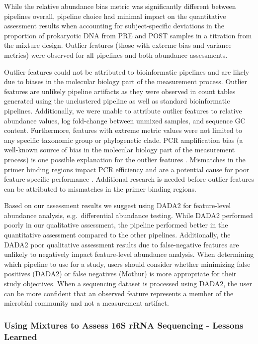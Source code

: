 \documentclass{bmcart}
\begin{document}
While the relative abundance bias metric was significantly different
between pipelines overall, pipeline choice had minimal impact on the
quantitative assessment results when accounting for subject-specific deviations
in the proportion of prokaryotic DNA from PRE and POST samples in a
titration from the mixture design. Outlier features (those with extreme bias
and variance metrics) were observed for all pipelines and both abundance assessments.

Outlier features could not be attributed to bioinformatic pipelines
and are likely due to biases in the molecular biology part of the measurement process.
Outlier features are unlikely pipeline artifacts as they were observed in count tables generated
using the unclustered pipeline as well as standard bioinformatic
pipelines. Additionally, we were unable to attribute outlier features to relative
abundance values, log fold-change between unmixed samples, and sequence
GC content. Furthermore, features with extreme metric values were not limited to any
specific taxonomic group or phylogenetic clade. PCR amplification
bias (a well-known source of bias in the molecular biology part of the
measurement process) is one possible explanation for the outlier features \cite{Sze565598}.
Mismatches in the primer binding regions impact PCR efficiency
and are a potential cause for poor feature-specific
performance \cite{wright2014exploiting}. Additional research is
needed before outlier features can be attributed to mismatches in the primer binding regions.

Based on our assessment results we suggest using DADA2 for
feature-level abundance analysis, e.g.~differential abundance testing.
While DADA2 performed poorly in our qualitative assessment,
the pipeline performed better in the quantitative assessment compared to the other pipelines.
Additionally, the DADA2 poor qualitative assessment results due to
false-negative features are unlikely to negatively impact feature-level abundance analysis.
When determining which pipeline to use for a study, users should consider
whether minimizing false positives (DADA2) or false negatives (Mothur)
is more appropriate for their study objectives.
When a sequencing dataset is processed using DADA2, the user can be more
confident that an observed feature represents a member of the
microbial community and not a measurement artifact.

\subsubsection*{Using Mixtures to Assess 16S rRNA Sequencing - Lessons Learned}
\end{document}
